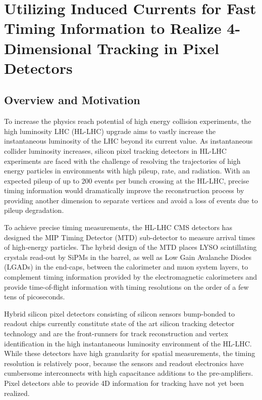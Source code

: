 
\chapter{Utilizing Induced Currents for Fast Timing Information to Realize 4-Dimensional Tracking in Pixel Detectors}

\section{Overview and Motivation}
To increase the physics reach potential of high energy collision experiments, the high luminosity LHC (HL-LHC) upgrade aims to vastly increase the instantaneous luminosity of the LHC beyond its current value. 
As instantaneous collider luminosity increases, silicon pixel tracking detectors in HL-LHC experiments are faced with the challenge of resolving the trajectories of high energy particles in environments with high pileup, rate, and radiation.
With an expected pileup of up to 200 events per bunch crossing at the HL-LHC, precise timing information would dramatically improve the reconstruction process by providing another dimension to separate vertices and avoid a loss of events due to pileup degradation.

To achieve precise timing measurements, the HL-LHC CMS detectors has designed the MIP Timing Detector (MTD) sub-detector to measure arrival times of high-energy particles.
The hybrid design of the MTD places LYSO scintillating crystals read-out by SiPMs in the barrel, as well as Low Gain Avalanche Diodes (LGADs) in the end-caps, between the calorimeter and muon system layers, to complement timing information provided by the electromagnetic calorimeters and provide time-of-flight information with timing resolutions on the order of a few tens of picoseconds.

Hybrid silicon pixel detectors consisting of silicon sensors bump-bonded to readout chips currently constitute state of the art silicon tracking detector technology and are the front-runners for track reconstruction and vertex identification in the high instantaneous luminosity environment of the HL-LHC.
While these detectors have high granularity for spatial measurements, the timing resolution is relatively poor, because the sensors and readout electronics have cumbersome interconnects with high capacitance additions to the pre-amplifiers. 
Pixel detectors able to provide 4D information for tracking have not yet been realized.


